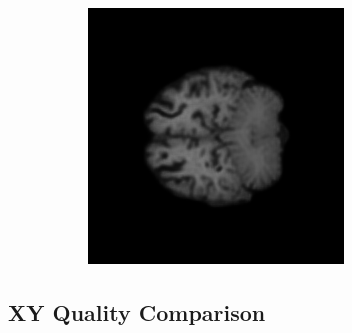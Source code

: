 \documentclass[12pt, fleqn, titlepage]{article}
\newcommand\skipper{1.4pt}
\begin{document}
\begin{figure}[H]
\begin{subfigure}[b]{0.7\textwidth}
		\hskip\skipper
		\includegraphics[width=0.22\linewidth]{imgs/training_progress/XY_model_3T_epoch_1_idx_77000}
	\end{subfigure}
\end{figure}

\subsection{XY Quality Comparison}\label{xy_generated}
\end{document}
